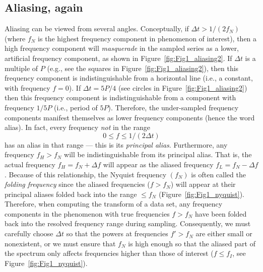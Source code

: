 \subsection{Aliasing, again}
Aliasing can be viewed from several angles.  Conceptually, if $\Delta t > 1/(2 f_N)$ (where $f_N$ is 
the highest frequency component in phenomenon of interest), then a high frequency component will \emph{masquerade} in the 
sampled series as a lower, artificial frequency component, as shown in Figure~\ref{fig:Fig1_aliasing2}.
\noindent
If $\Delta t$ is a multiple of $P$ (e.g., see the squares in Figure~\ref{fig:Fig1_aliasing2}), then this frequency component is indistinguishable from a 
horizontal line (i.e., a constant, with frequency $f = 0$).  If  $\Delta t = 5 P/4$ (see circles in Figure~\ref{fig:Fig1_aliasing2}) then this frequency 
component is indistinguishable from a component with frequency $1/5 P$ (i.e., period of $5P$).  Therefore, the 
under-sampled frequency components manifest themselves as lower frequency components 
(hence the word alias).  In fact, every frequency \emph{not} in the range
\begin{equation}
0 \leq f \leq 1/(2\Delta t)
\end{equation}
has an alias in that range --- this is its \emph{principal alias}.  Furthermore, any frequency $f_H > f_N$ 
will be indistinguishable from its principal alias.  That is, the actual frequency $f_H = f_N + \Delta f$ will appear as the aliased frequency $f_L = f_N - \Delta f$.
	Because of this relationship, the Nyquist frequency $(f_N)$ is often called the \emph{folding frequency} since the
aliased frequencies ($f > f_N$) will appear at their principal aliases folded back into the range $\leq f_N$ (Figure~\ref{fig:Fig1_nyquist}).
Therefore, when computing the transform of a data set,
any frequency components in the phenomenon with true frequencies $f > f_N$ have been folded back into 
the resolved frequency range during sampling.  Consequently, we must carefully choose $\Delta t$ so that the powers at frequencies $f' > f_N$ are either small 
or nonexistent, or we must ensure that $f_N$ is high enough so that the aliased part of the spectrum only affects 
frequencies higher than those of interest ($f \leq f_I$, see Figure~\ref{fig:Fig1_nyquist}).

